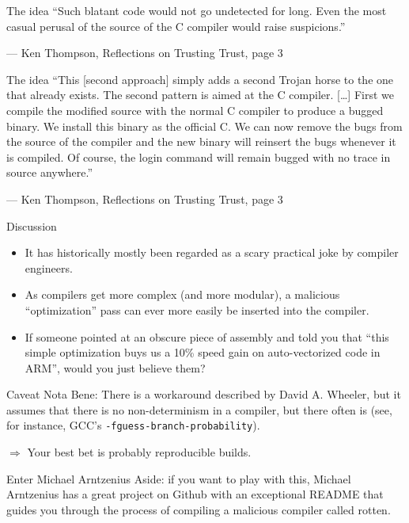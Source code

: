 \documentclass[aspectratio=169]{beamer}
\begin{document}
  \begin{frame}{The idea}
    “Such blatant code would not go undetected for long. Even the most casual
     perusal of the source of the C compiler would raise suspicions.” 

     \indent — Ken Thompson, Reflections on Trusting Trust, page 3
  \end{frame}
  \begin{frame}{The idea}
    “This [second approach] simply adds a second Trojan horse to the one that
     already exists. The second pattern is aimed at the C compiler. [\ldots] First
     we compile the modified source with the normal C compiler to produce a
     bugged binary. We install this binary as the official C. We can now remove
     the bugs from the source of the compiler and the new binary will reinsert
     the bugs whenever it is compiled. Of course, the login command will remain
     bugged with no trace in source anywhere.”

     \indent — Ken Thompson, Reflections on Trusting Trust, page 3
  \end{frame}
  \begin{frame}{Discussion}
    \begin{itemize}
      \item It has historically mostly been regarded as a scary practical joke
            by compiler engineers.
      \item As compilers get more complex (and more modular), a malicious
            “optimization” pass can ever more easily be inserted into the
            compiler.
      \item If someone pointed at an obscure piece of assembly and told you
            that “this simple optimization buys us a 10\% speed gain on
            auto-vectorized code in ARM”, would you just believe them?
    \end{itemize}
  \end{frame}
  \begin{frame}{Caveat}
    Nota Bene: There is a workaround described by David A. Wheeler, but it
    assumes that there is no non-determinism in a compiler, but there often is
    (see, for instance, GCC’s \texttt{-fguess-branch-probability}).

    $\Rightarrow$ Your best bet is probably reproducible builds.
  \end{frame}
  \begin{frame}{Enter Michael Arntzenius}
    Aside: if you want to play with this, Michael Arntzenius has a great project
    on Github with an exceptional README that guides you through the process of
    compiling a malicious compiler called rotten.
  \end{frame}
\end{document}
